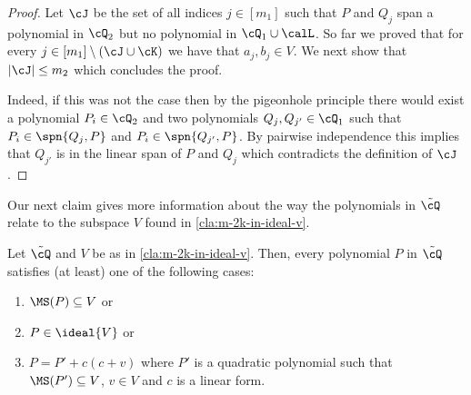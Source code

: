 \begin{proof}
Let $\cJ$ be the set of all indices $j\in [m_1]$ such that $P$ and $Q_j$ span a polynomial in $\cQ_2$ but no polynomial in $\cQ_1\cup \calL$. So far we proved that  for every $j\in [m_1]\setminus (\cJ\cup \cK)$ we have that $a_j,b_j\in V$. We next show that $|\cJ|\leq m_2$ which concludes the proof. 

Indeed, if this was not the case then by the pigeonhole principle there would exist a polynomial $P_i\in\cQ_2$ and two polynomials $Q_j,Q_{j'}\in\cQ_1 $ such that $P_i\in\spn{Q_j,P}$ and $P_i\in\spn{Q_{j'},P}$. By pairwise independence this implies that $Q_{j'}$ is in the linear span of $P$ and $Q_j$ which contradicts the definition of $\cJ$.
\end{proof}


Our next claim gives more information about the way the polynomials in $\tilde\cQ$ relate to the subspace $V$ found in \autoref{cla:m-2k-in-ideal-v}.

\begin{claim}\label{cla:mod-V}
Let $\tilde{\cQ}$ and $V$ be as in \autoref{cla:m-2k-in-ideal-v}. Then,  every polynomial $P$ in $\tilde{\cQ}$ satisfies (at least) one of the following cases:
\begin{enumerate}
\item $\MS(P)\subseteq V$ or
\item $P\in \ideal{V}$ or
\item  $P=P'+c(c + v)$ where $P'$ is a quadratic polynomial such that $\MS(P')\subseteq V$, $v\in V$ and $c$ is a linear form.
\end{enumerate}
\end{claim}

